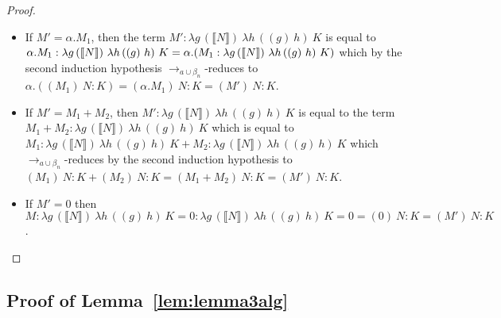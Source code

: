 \documentclass{LMCS}
\newcommand{\xto}[1]{\ensuremath{\rightarrow_{#1}}}
\newcommand{\tobalgred}{\xto{a\cup\beta_n}}
\newcommand{\wt}[1]{\llbracket{#1}\rrbracket}
\begin{document}
\begin{proof}
\begin{itemize}
\begin{itemize}
	\item If $M' = \alpha.M_1$, then the term $M':\lambda g\,(\wt{N})~\lambda h\,((g)~h)~K$ is equal to $\alpha.M_1:\break\lambda g\,(\wt{N})~\lambda h\,((g)~h)~K = \alpha.(M_1:\lambda g\,(\wt{N})~\lambda h\,((g)~h)~K)$ which by the second induction hypothesis $\tobalgred$-reduces to $\alpha.((M_1)~N:K)=(\alpha.M_1)~N:K = (M')~N : K$.
	\item If $M' = M_1+M_2$, then $M':\lambda g\,(\wt{N})~\lambda h\,((g)~h)~K$ is equal to the term $M_1+M_2 :\lambda g\,(\wt{N})~\lambda h\,((g)~h)~K$ which is equal to $M_1 :\lambda g\,(\wt{N})~\lambda h\,((g)~h)~K+M_2 :\lambda g\,(\wt{N})~\lambda h\,((g)~h)~K$ which $\tobalgred$-reduces by the second induction hypothesis to $(M_1)~N:K+(M_2)~N : K = (M_1+M_2)~N:K = (M')~N : K$.
	\item If $M'=0$ then $M:\lambda g\,(\wt{N})~\lambda h\,((g)~h)~K= 0 :\lambda g\,(\wt{N})~\lambda h\,((g)~h)~K = 0= (0)~N:K = (M')~N : K$.\qedhere
      \end{itemize}
  \end{itemize}
\end{proof}

\subsection{Proof of Lemma~\ref{lem:lemma3alg}}\label{proof:lemma3alg}~
\end{document}
